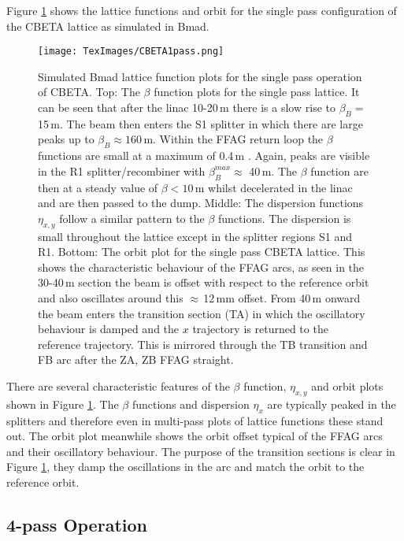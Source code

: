 \documentclass[11pt]{article}
\begin{document}
Figure \ref{fig:CBETA1pass} shows the lattice functions and orbit for the single pass configuration of the CBETA lattice as simulated in Bmad.

\begin{figure}[H]
\centering
\texttt{[image: TexImages/CBETA1pass.png]}
\caption{\label{fig:CBETA1pass} Simulated Bmad lattice function plots for the single pass operation of CBETA. Top: The $\beta$ function plots for the single pass lattice. It can be seen that after the linac 10-20\,m there is a slow rise to $\beta_{B} =$ 15\,m. The beam then enters the S1 splitter in which there are large peaks up to $\beta_{B} \approx 160$\,m. Within the FFAG return loop the $\beta$ functions are small at a maximum of 0.4\,m \cite{CBETATDR}. Again, peaks are visible in the R1 splitter/recombiner with $\beta^{max}_{B} \approx$ 40\,m. The $\beta$ function are then at a steady value of $\beta < 10$\,m whilst decelerated in the linac and are then passed to the dump. Middle: The dispersion functions $\eta_{x,y}$ follow a similar pattern to the $\beta$ functions. The dispersion is small throughout the lattice except in the splitter regions S1 and R1. Bottom: The orbit plot for the single pass CBETA lattice. This shows the characteristic behaviour of the FFAG arcs, as seen in the 30-40\,m section the beam is offset with respect to the reference orbit and also oscillates around this $\approx$\,12\,mm offset. From 40\,m onward the beam enters the transition section (TA) in which the oscillatory behaviour is damped and the $x$ trajectory is returned to the reference trajectory. This is mirrored through the TB transition and FB arc after the ZA, ZB FFAG straight.}
\end{figure}       

There are several characteristic features of the $\beta$ function, $\eta_{x,y}$ and orbit plots shown in Figure \ref{fig:CBETA1pass}. The $\beta$ functions and dispersion $\eta_{x}$ are typically peaked in the splitters and therefore even in multi-pass plots of lattice functions these stand out. The orbit plot meanwhile shows the orbit offset typical of the FFAG arcs and their oscillatory behaviour. The purpose of the transition sections is clear in Figure \ref{fig:CBETA1pass}, they damp the oscillations in the arc and match the orbit to the reference orbit.    

\subsection{4-pass Operation}
\end{document}
